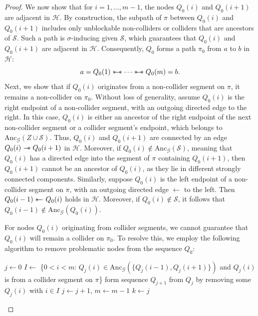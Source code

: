 \documentclass[accepted]{uai2025} %
\newcommand{\anc}{\text{Anc}}
\newcommand{\hut}{\mathrel{\leftarrow}}
\newcommand{\sut}{\mathrel{{\ast\mkern-11mu\relbar\mkern-9mu\relbar}}}
\newcommand{\tus}{\mathrel{{\relbar\mkern-11mu\relbar\mkern-11mu\ast}}}
\newcommand{\sus}{\mathrel{{\ast\mkern-11mu\relbar\mkern-9mu\relbar\mkern-11mu\ast}}}
\begin{document}
\begin{proof}
We now show that for $i = 1, \dots, m - 1$, the nodes $Q_0(i)$ and $Q_0(i+1)$ are adjacent in $\mathcal{H}$. By construction, the subpath of $\pi$ between $Q_0(i)$ and $Q_0(i+1)$ includes only unblockable non-colliders or colliders that are ancestors of $\mathcal{S}$. Such a path is $\sigma$-inducing given $\mathcal{S}$, which guarantees that $Q_0(i)$ and $Q_0(i+1)$ are adjacent in $\mathcal{H}$. Consequently, $Q_0$ forms a path $\pi_0$ from $a$ to $b$ in $\mathcal{H}$:
$$
a = Q_0(1)\sus\cdots\sus Q_0(m) = b.
$$
Next, we show that if $Q_0(i)$ originates from a non-collider segment on $\pi$, it remains a non-collider on $\pi_0$. Without loss of generality, assume $Q_0(i)$ is the right endpoint of a non-collider segment, with an outgoing directed edge to the right. In this case, $Q_0(i)$ is either an ancestor of the right endpoint of the next non-collider segment or a collider segment's endpoint, which belongs to $\anc_\mathcal{G}(Z \cup \mathcal{S})$. Thus, $Q_0(i)$ and $Q_0(i+1)$ are connected by an edge $Q_0(i) \tus  Q_0(i+1)$ in $\mathcal{H}$. Moreover, if \( Q_0(i) \notin \anc_\mathcal{G}(\mathcal{S}) \), meaning that \( Q_0(i) \) has a directed edge into the segment of \( \pi \) containing \( Q_0(i+1) \), then \( Q_0(i+1) \) cannot be an ancestor of \( Q_0(i) \), as they lie in different strongly connected components. Similarly, suppose \( Q_0(i) \) is the left endpoint of a non-collider segment on \( \pi \), with an outgoing directed edge \( \hut \) to the left. Then \( Q_0(i-1) \sut Q_0(i) \) holds in \( \mathcal{H} \). Moreover, if \( Q_0(i) \notin \mathcal{S} \), it follows that \( Q_0(i-1) \notin \anc_\mathcal{G}(Q_0(i)) \).

For nodes $Q_0(i)$ originating from collider segments, we cannot guarantee that $Q_0(i)$ will remain a collider on $\pi_0$. To resolve this, we employ the following algorithm to remove problematic nodes from the sequence $Q_0$:

\begin{algorithm}
\begin{algorithmic}[1]
\STATE $j \leftarrow 0$
\REPEAT
    \STATE $I\leftarrow$ \{$0<i<m$: $Q_j(i)\in\anc_\mathcal{G}(\{Q_j(i-1),Q_j(i+1)\})$ and $Q_j(i)$ is from a collider segment on $\pi$\}
        \STATE form sequence $Q_{j+1}$ from $Q_j$ by removing some $Q_j(i)$ with $i\in I$
        \STATE $j \leftarrow j + 1$, $m\leftarrow m-1$
    \ENDIF
{}
\STATE $k\leftarrow j$
\end{algorithmic}
\end{algorithm}


\end{proof}
\end{document}
